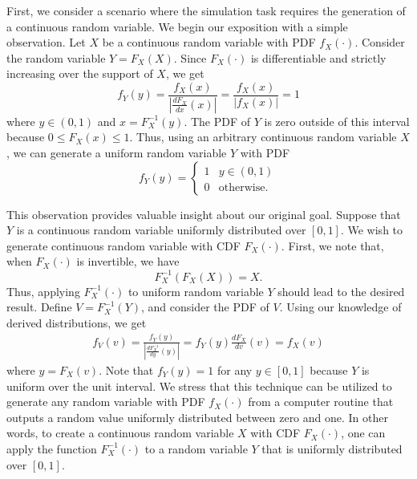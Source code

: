 First, we consider a scenario where the simulation task requires the generation of a continuous random variable.
We begin our exposition with a simple observation.
Let $X$ be a continuous random variable with PDF $f_X (\cdot)$.
Consider the random variable $Y = F_X(X)$.
Since $F_X (\cdot)$ is differentiable and strictly increasing over the support of $X$, we get
\begin{equation*}
f_Y (y) = \frac{f_X (x)}{\left| \frac{d F_X}{dx} (x) \right|}
= \frac{f_X (x)}{| f_X (x) |} = 1
\end{equation*}
where $y \in (0, 1)$ and $x = F_X^{-1} (y)$.
The PDF of $Y$ is zero outside of this interval because $0 \leq F_X (x) \leq 1$.
Thus, using an arbitrary continuous random variable $X$, we can generate a uniform random variable $Y$ with PDF
\begin{equation*}
f_Y(y) = \begin{cases} 1 & y \in (0,1) \\
0 & \text{otherwise} . \end{cases}
\end{equation*}

This observation provides valuable insight about our original goal.
Suppose that $Y$ is a continuous random variable uniformly distributed over $[0,1]$.
We wish to generate continuous random variable with CDF $F_X(\cdot)$.
First, we note that, when $F_X (\cdot)$ is invertible, we have
\begin{equation*}
F_X^{-1} \left( F_X (X) \right) = X .
\end{equation*}
Thus, applying $F_X^{-1} (\cdot)$ to uniform random variable $Y$ should lead to the desired result.
Define $V = F_X^{-1} (Y)$, and consider the PDF of $V$.
Using our knowledge of derived distributions, we get
\begin{equation*}
\begin{split}
f_V (v) = \frac{ f_Y (y) }{ \left| \frac{d F_X^{-1}}{dy} (y) \right| }
= f_Y (y) \frac{d F_X}{dv} (v) = f_X (v)
\end{split}
\end{equation*}
where $y = F_X (v)$.
Note that $f_Y (y) = 1$ for any $y \in [0,1]$ because $Y$ is uniform over the unit interval.
We stress that this technique can be utilized to generate any random variable with PDF $f_X (\cdot)$ from a computer routine that outputs a random value uniformly distributed between zero and one.
In other words, to create a continuous random variable $X$ with CDF $F_X (\cdot)$, one can apply the function $F_X^{-1} (\cdot)$ to a random variable $Y$ that is uniformly distributed over $[0,1]$.

